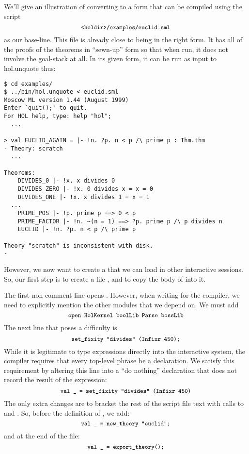 We'll give an illustration of converting to a form that can be
compiled using the script
\[
  \mbox{\ml{<holdir>/examples/euclid.sml}}
\] as our base-line.  This
file is already close to being in the right form.  It has all of the
proofs of the theorems in ``sewn-up'' form so that when run, it does
not involve the goal-stack at all.  In its given form, it can be run
as input to \textsf{hol.unquote} thus:

\setcounter{sessioncount}{0}
\begin{session}
\begin{verbatim}
$ cd examples/
$ ../bin/hol.unquote < euclid.sml
Moscow ML version 1.44 (August 1999)
Enter `quit();' to quit.
For HOL help, type: help "hol";
  ...

> val EUCLID_AGAIN = |- !n. ?p. n < p /\ prime p : Thm.thm
- Theory: scratch
  ...

Theorems:
    DIVIDES_0 |- !x. x divides 0
    DIVIDES_ZERO |- !x. 0 divides x = x = 0
    DIVIDES_ONE |- !x. x divides 1 = x = 1
  ...
    PRIME_POS |- !p. prime p ==> 0 < p
    PRIME_FACTOR |- !n. ~(n = 1) ==> ?p. prime p /\ p divides n
    EUCLID |- !n. ?p. n < p /\ prime p

Theory "scratch" is inconsistent with disk.
-
\end{verbatim}
\end{session}

However, we now want to create a  that we can load in
other interactive sessions.  So, our first step is to create a file
, and to copy the body of  into
it.

The first non-comment line opens .  However, when
writing for the compiler, we need to explicitly mention the other
\HOL{} modules that we depend on.  We must add
\[
\mbox{\ml{open HolKernel boolLib Parse bossLib}}
\]
The next line that poses a difficulty is
\[
  \mbox{\ml{set\_fixity "divides" (Infixr 450);}}
\]
While it is legitimate to type expressions directly into the
interactive system, the compiler requires that every top-level phrase
be a declaration.  We satisfy this requirement by altering this line
into a ``do nothing'' declaration that does not record the result of
the expression:
\[
\mbox{\ml{val \_{} = set\_fixity "divides" (Infixr 450)}}
\]
The only extra changes are to bracket the rest of the script file text
with calls to  and .  So,
before the definition of , we add:
\[
\mbox{\ml{val \_{} = new\_theory "euclid";}}
\]
and at the end of the file:
\[
\mbox{\ml{val \_{} = export\_theory();}}
\]

